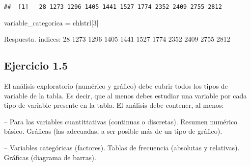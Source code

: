 \documentclass[
]{article}
\newenvironment{Shaded}{\begin{snugshade}}{\end{snugshade}}
\newcommand{\AttributeTok}[1]{\textcolor[rgb]{0.77,0.63,0.00}{#1}}
\newcommand{\ConstantTok}[1]{\textcolor[rgb]{0.00,0.00,0.00}{#1}}
\newcommand{\DecValTok}[1]{\textcolor[rgb]{0.00,0.00,0.81}{#1}}
\newcommand{\FloatTok}[1]{\textcolor[rgb]{0.00,0.00,0.81}{#1}}
\newcommand{\FunctionTok}[1]{\textcolor[rgb]{0.00,0.00,0.00}{#1}}
\newcommand{\NormalTok}[1]{#1}
\newcommand{\OtherTok}[1]{\textcolor[rgb]{0.56,0.35,0.01}{#1}}
\newcommand{\SpecialCharTok}[1]{\textcolor[rgb]{0.00,0.00,0.00}{#1}}
\newcommand{\StringTok}[1]{\textcolor[rgb]{0.31,0.60,0.02}{#1}}
\begin{document}
\begin{verbatim}
##  [1]   28 1273 1296 1405 1441 1527 1774 2352 2409 2755 2812
\end{verbatim}

\begin{Shaded}
\begin{Highlighting}[]
\NormalTok{variable\_categorica }\OtherTok{=}\NormalTok{ chlstrl[}\DecValTok{3}\NormalTok{]}
\end{Highlighting}
\end{Shaded}

Respuesta. índices: 28 1273 1296 1405 1441 1527 1774 2352 2409 2755 2812

\hypertarget{ejercicio-1.5}{%
\subsection{Ejercicio 1.5}\label{ejercicio-1.5}}

El análisis exploratorio (numérico y gráfico) debe cubrir todos los
tipos de variable de la tabla. Es decir, que al menos debes estudiar una
variable por cada tipo de variable presente en la tabla. El análisis
debe contener, al menos:

-- Para las variables cuantittativas (continuas o discretas). Resumen
numérico básico. Gráficas (las adecuadas, a ser posible más de un tipo
de gráfico).

-- Variables categóricas (factores). Tablas de frecuencia (absolutas y
relativas). Gráficas (diagrama de barras).

\begin{Shaded}
\end{Shaded}
\end{document}
